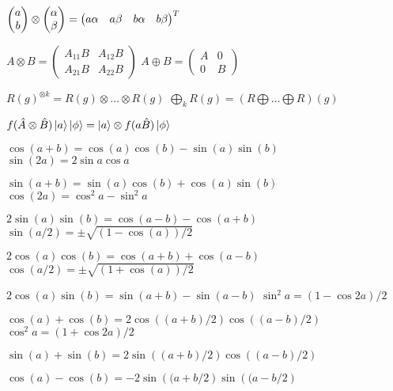\begin{squishlist}
\item $\begin{pmatrix} a \\ b \end{pmatrix} \otimes \begin{pmatrix} \alpha \\ \beta \end{pmatrix} = \begin{pmatrix} a \alpha & a \beta & b \alpha & b \beta \end{pmatrix}^T$
    
\item $A \otimes B = \begin{pmatrix} A_{11}B & A_{12}B \\ A_{21}B & A_{22}B \end{pmatrix}$
\squishsep $A \oplus B = \begin{pmatrix} A & 0 \\ 0 & B \end{pmatrix}$

\item $R(g)^{\otimes k} = R(g) \otimes \ldots \otimes R(g)$ \squishsep $\bigoplus_k R(g) = (R \bigoplus \ldots \bigoplus R)(g)$

\item $f(\hat{A} \otimes \hat{B}) \ket{a}\ket{\phi} = \ket{a} \otimes f(a\hat{B})\ket{\phi}$
\end{squishlist}


\begin{squishlist}
    
    \item $\cos(a+b) = \cos(a)\cos(b)-\sin(a)\sin(b)$ \squishsep $\sin(2a) = 2\sin a \cos a$
    \item $\sin(a+b) = \sin(a)\cos(b) + \cos(a)\sin(b)$ \squishsep $\cos(2a) = \cos^2 a - \sin^2 a$
    \item $2\sin(a)\sin(b) = \cos(a-b) - \cos(a+b)$ \smallsquishsep $\sin(a/2) = \pm \sqrt{(1-\cos(a))/2}$
    \item $2\cos(a)\cos(b) = \cos(a+b) + \cos(a-b)$ \smallsquishsep $\cos(a/2) = \pm \sqrt{(1+\cos(a))/2}$
    \item $2\cos(a)\sin(b) = \sin(a+b) - \sin(a-b)$ \smallsquishsep $\sin^2a = (1-\cos 2a)/2$
    \item $\cos(a) + \cos(b) = 2\cos\left((a+b)/2\right)\cos\left((a-b)/2\right)$ \;\squishitem \; $\cos^2 a = (1+\cos 2a) / 2$
    \item $\sin(a) + \sin(b) = 2\sin\left((a+b)/2\right)\cos\left((a-b)/2\right)$ 
    \item $\cos(a) - \cos(b) = -2\sin\left((a+b/2\right)\sin\left((a-b/2\right)$ 
\end{squishlist} 

